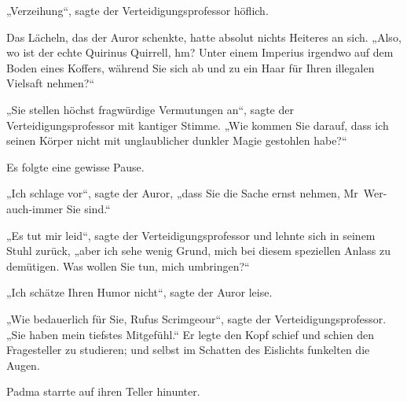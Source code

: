 „Verzeihung“, sagte der Verteidigungsprofessor höflich.

Das Lächeln, das der Auror schenkte, hatte absolut nichts Heiteres an sich.
„Also, wo ist der echte Quirinus Quirrell, hm? Unter einem Imperius irgendwo auf dem Boden eines Koffers, während Sie sich ab und zu ein Haar für Ihren illegalen Vielsaft nehmen?“

„Sie stellen höchst fragwürdige Vermutungen an“, sagte der Verteidigungsprofessor mit kantiger Stimme.
„Wie kommen Sie darauf, dass ich seinen Körper nicht mit unglaublicher dunkler Magie gestohlen habe?“

Es folgte eine gewisse Pause.

„Ich schlage vor“, sagte der Auror, „dass Sie die Sache ernst nehmen, Mr~Wer-auch-immer Sie sind.“

„Es tut mir leid“, sagte der Verteidigungsprofessor und lehnte sich in seinem Stuhl zurück, „aber ich sehe wenig Grund, mich bei diesem speziellen Anlass zu demütigen. Was wollen Sie tun, mich umbringen?“

„Ich schätze Ihren Humor nicht“, sagte der Auror leise.

„Wie bedauerlich für Sie, Rufus Scrimgeour“, sagte der Verteidigungsprofessor.
„Sie haben mein tiefstes Mitgefühl.“ Er legte den Kopf schief und schien den Fragesteller zu studieren; und selbst im Schatten des Eislichts funkelten die Augen.

\later

Padma starrte auf ihren Teller hinunter.

